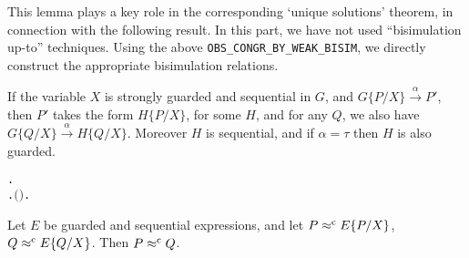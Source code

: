 This lemma plays a key role in the
corresponding `unique solutions' theorem, in connection with the
following result. 
In this part, we have not 
used 
 ``bisimulation up-to'' techniques. Using
 the  above \texttt{OBS_CONGR_BY_WEAK_BISIM},
 we  directly construct the appropriate bisimulation relations.
\begin{lemma}
If the variable $X$ is strongly guarded and sequential in $G$, and
$G\{P/X\}\overset{\alpha}{\rightarrow} P'$, then $P'$ takes the form
$H\{P/X\}$, for some  $H$, and for any $Q$, we also have 
$G\{Q/X\}\overset{\alpha}{\rightarrow} H\{Q/X\}$. Moreover $H$ is
sequential, and if $\alpha = \tau$ then $H$ is also guarded.
\begin{alltt}
\HOLTokenTurnstile{}   \HOLSymConst{\HOLTokenConj{}}   \HOLSymConst{\HOLTokenImp{}}
   \HOLSymConst{\HOLTokenForall{}}  .
         \HOLTokenTransBegin{}\HOLTokenTransEnd {} \HOLSymConst{\HOLTokenImp{}}
       \HOLSymConst{\HOLTokenExists{}}.   \HOLSymConst{\HOLTokenConj{}} \ensuremath{(} \HOLSymConst{\ensuremath{=}} \HOLSymConst{\ensuremath{\tau}} \HOLSymConst{\HOLTokenImp{}}  \ensuremath{)} \HOLSymConst{\HOLTokenConj{}}  \HOLSymConst{\ensuremath{=}}   \HOLSymConst{\HOLTokenConj{}} \HOLSymConst{\HOLTokenForall{}}.   \HOLTokenTransBegin{}\HOLTokenTransEnd {} 
\end{alltt}
\end{lemma}

\begin{theorem}
Let $E$ be guarded and sequential expressions, and let $P \mathrel{\approx^{\rm{c}}}
E\{P/X\}$,
$Q \mathrel{\approx^{\rm{c}}} E\{Q/X\}$. Then $P \mathrel{\approx^{\rm{c}}} Q$.
\begin{alltt}
\HOLTokenTurnstile{}   \HOLSymConst{\HOLTokenConj{}}   \HOLSymConst{\HOLTokenConj{}}  \HOLSymConst{\HOLTokenObsCongr}   \HOLSymConst{\HOLTokenConj{}}  \HOLSymConst{\HOLTokenObsCongr}   \HOLSymConst{\HOLTokenImp{}}  \HOLSymConst{\HOLTokenObsCongr} 
\end{alltt}
\end{theorem}

